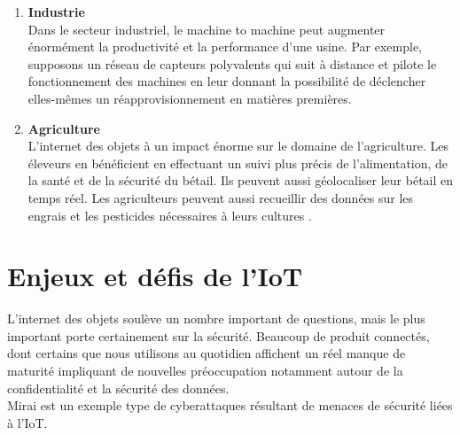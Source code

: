 \begin{enumerate}
		\item \textbf{Industrie}\\
		Dans le secteur industriel, le machine to machine peut augmenter énormément la productivité et la performance d’une usine. Par exemple, supposons un réseau de capteurs polyvalents qui suit à distance et pilote le fonctionnement des machines en leur donnant la possibilité de déclencher elles-mêmes un réapprovisionnement en matières premières.
		
		\item \textbf{Agriculture}\\
		L’internet des objets à un impact énorme sur le domaine de l’agriculture. Les éleveurs en bénéf{\kern0pt}icient en ef{\kern0pt}fectuant un suivi plus précis de l’alimentation, de la santé et de la sécurité du bétail. Ils peuvent aussi géolocaliser leur bétail en temps réel. Les agriculteurs peuvent aussi recueillir des données sur les engrais et les pesticides nécessaires à leurs cultures \cite{krigman2018agriculture}.
	\end{enumerate}
	\newpage
	\section{Enjeux et déf{\kern0pt}is de l’IoT}
	L’internet des objets soulève un nombre important de questions, mais le plus important porte certainement sur la sécurité. Beaucoup de produit connectés, dont certains que nous utilisons au quotidien af{\kern0pt}f{\kern0pt}ichent un réel manque de maturité impliquant de nouvelles préoccupation notamment autour de la conf{\kern0pt}identialité et la sécurité des données.\\
Mirai est un exemple type de cyberattaques résultant de menaces de sécurité liées à l’IoT.

